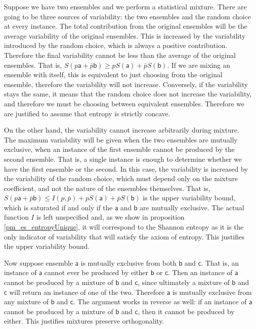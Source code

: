 \documentclass[10pt,twocolumn, nofootinbib]{revtex4-2}
\newcommand{\ens}[1][e] {\mathsf{#1}} %
\begin{document}
\begin{justification}
	Suppose we have two ensembles and we perform a statistical mixture. There are going to be three sources of variability: the two ensembles and the random choice at every instance. The total contribution from the original ensembles will be the average variability of the original ensembles. This is increased by the variability introduced by the random choice, which is always a positive contribution. Therefore the final variability cannot be less than the average of the original ensembles. That is, $S(p\ens[a] + \bar{p} \ens[b]) \geq p S(\ens[a]) + \bar{p} S(\ens[b])$. If we are mixing an ensemble with itself, this is equivalent to just choosing from the original ensemble, therefore the variability will not increase. Conversely, if the variability stays the same, it means that the random choice does not increase the variability, and therefore we must be choosing between equivalent ensembles. Therefore we are justified to assume that entropy is strictly concave.
	
	On the other hand, the variability cannot increase arbitrarily during mixture. The maximum variability will be given when the two ensembles are mutually exclusive, when an instance of the first ensemble cannot be produced by the second ensemble. That is, a single instance is enough to determine whether we have the first ensemble or the second. In this case, the variability is increased by the variability of the random choice, which must depend only on the mixture coefficient, and not the nature of the ensembles themselves. That is, $S(p\ens[a] + \bar{p} \ens[b]) \leq I(p, \bar{p}) + p S(\ens[a]) + \bar{p} S(\ens[b])$ is the upper variability bound, which is saturated if and only if the $\ens[a]$ and $\ens[b]$ are mutually exclusive. The actual function $I$ is left unspecified and, as we show in proposition \ref{pm_es_entropyUnique}, it will correspond to the Shannon entropy as it is the only indicator of variability that will satisfy the axiom of entropy. This justifies the upper variability bound.
	
	Now suppose ensemble $\ens[a]$ is mutually exclusive from both $\ens[b]$ and $\ens[c]$. That is, an instance of $\ens[a]$ cannot ever be produced by either $\ens[b]$ or $\ens[c]$. Then an instance of $\ens[a]$ cannot be produced by a mixture of $\ens[b]$ and $\ens[c]$, since ultimately a mixture of $\ens[b]$ and $\ens[c]$ will return an instance of one of the two. Therefore $\ens[a]$ is mutually exclusive from any mixture of $\ens[b]$ and $\ens[c]$. The argument works in reverse as well: if an instance of $\ens[a]$ cannot be produced by a mixture of $\ens[b]$ and $\ens[c]$, then it cannot be produced by either. This justifies mixtures preserve orthogonality.
\end{justification}
\end{document}
